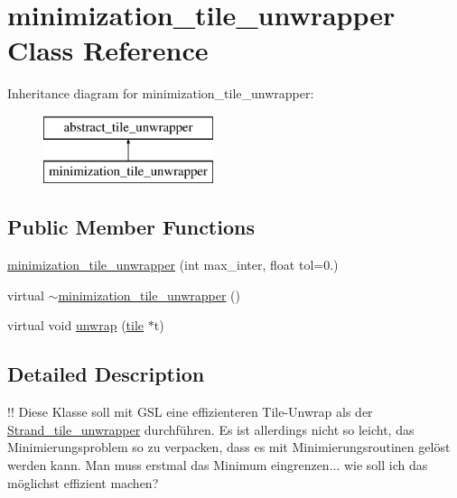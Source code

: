 \hypertarget{classminimization__tile__unwrapper}{\section{minimization\-\_\-tile\-\_\-unwrapper Class Reference}
\label{classminimization__tile__unwrapper}
}
Inheritance diagram for minimization\-\_\-tile\-\_\-unwrapper\-:\begin{figure}[H]
\begin{center}
\leavevmode
\includegraphics[height=2.000000cm]{classminimization__tile__unwrapper}
\end{center}
\end{figure}
\subsection*{Public Member Functions}
\begin{DoxyCompactItemize}
\item 
\hyperlink{classminimization__tile__unwrapper_acd1f71bbf4da842023eeb888ff07df07}{minimization\-\_\-tile\-\_\-unwrapper} (int max\-\_\-inter, float tol=0.)
\item 
virtual \hyperlink{classminimization__tile__unwrapper_a87733a219fdd57965ecccf833d6d8ea7}{$\sim$minimization\-\_\-tile\-\_\-unwrapper} ()
\item 
virtual void \hyperlink{classminimization__tile__unwrapper_a029e05336da3208ecb7a00ab553dd1c1}{unwrap} (\hyperlink{classtile}{tile} $\ast$t)
\end{DoxyCompactItemize}


\subsection{Detailed Description}
!! Diese Klasse soll mit G\-S\-L eine effizienteren Tile-\/\-Unwrap als der \hyperlink{class_strand__tile__unwrapper}{Strand\-\_\-tile\-\_\-unwrapper} durchführen. Es ist allerdings nicht so leicht, das Minimierungsproblem so zu verpacken, dass es mit Minimierungsroutinen gelöst werden kann. Man muss erstmal das Minimum eingrenzen... wie soll ich das möglichst effizient machen? 


